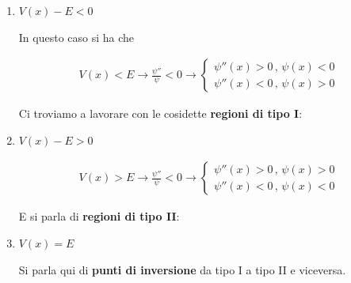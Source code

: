 \begin{enumerate}
	\item $V(x)-E<0$
	
	In questo caso si ha che 
	
	\begin{align}
	V(x)<E \rightarrow  \frac{\psi''}{\psi}<0 \rightarrow 
	\left\{
	\begin{array}{cc}
	\psi''(x) >0 \, , \, \psi(x)<0 \\
	\psi''(x) <0 \, , \, \psi(x)>0
	\end{array}
	\right.
	\end{align}
	
	Ci troviamo a lavorare con le cosidette \textbf{regioni di tipo I}:
	
	\begin{figure}[!htb]
	\end{figure}
	
	\item $V(x)-E>0$
	
	\begin{align}
	V(x)>E \rightarrow  \frac{\psi''}{\psi}<0 \rightarrow 
	\left\{
	\begin{array}{cc}
	\psi''(x) >0 \, , \, \psi(x)>0 \\
	\psi''(x) <0 \, , \, \psi(x)<0
	\end{array}
	\right.
	\end{align}
	
	E si parla di  \textbf{regioni di tipo II}:
	
	\begin{figure}[!htb]
	\end{figure}
\item $V(x)=E$ 

	  Si parla qui di \textbf{punti di inversione} da tipo I a tipo II e viceversa.
\end{enumerate}

